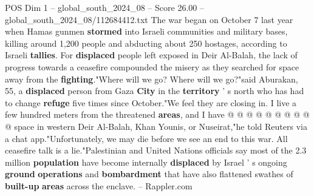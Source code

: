 \begin{textsample}{POS Dim 1 – global\_south\_2024\_08 – Score 26.00 – global\_south\_2024\_08/112684412.txt}
The war began on October 7 last year when Hamas gunmen \textbf{stormed} into Israeli communities and military bases, killing around 1,200 people and abducting about 250 hostages, according to Israeli \textbf{tallies}.
For \textbf{displaced} people left exposed in Deir Al-Balah, the lack of progress towards a ceasefire compounded the misery as they searched for space away from the \textbf{fighting}."Where will we go?
Where will we go?"said Aburakan, 55, a \textbf{displaced} person from Gaza \textbf{City} in the \textbf{territory} ' s north who has had to change \textbf{refuge} five times since October."We feel they are closing in.
I live a few hundred meters from the threatened \textbf{areas}, and I have @ @ @ @ @ @ @ @ @ @ space in western Deir Al-Balah, Khan Younis, or Nuseirat,"he told Reuters via a chat app."Unfortunately, we may die before we see an end to this war.
All ceasefire talk is a lie."Palestinian and United Nations officials say most of the 2.3 million \textbf{population} have become internally \textbf{displaced} by Israel ' s ongoing \textbf{ground} \textbf{operations} and \textbf{bombardment} that have also flattened swathes of \textbf{built-up} \textbf{areas} across the enclave. -- Rappler.com

\end{textsample}
